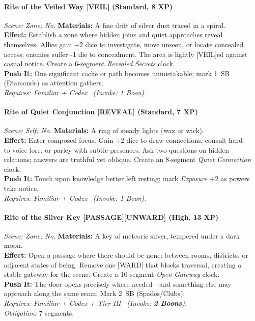 \paragraph{Rite of the Veiled Way \textnormal{[VEIL]} (Standard, 8 XP)} \emph{Scene; Zone; No.}
\textbf{Materials:} A fine drift of silver dust traced in a spiral.\\
\textbf{Effect:} Establish a zone where hidden joins and quiet approaches reveal themselves. Allies gain +2 dice to investigate, move unseen, or locate concealed access; enemies suffer -1 die to concealment. The area is lightly [VEIL]ed against casual notice. Create a 6-segment \emph{Revealed Secrets} clock.\\
\textbf{Push It:} One significant cache or path becomes unmistakable; mark 1~SB (Diamonds) as attention gathers.\\
\emph{Requires: Familiar + Codex \ (\textit{Invoke:} 1 Boon).}

\paragraph{Rite of Quiet Conjunction \textnormal{[REVEAL]} (Standard, 7 XP)} \emph{Scene; Self; No.}
\textbf{Materials:} A ring of steady lights (wax or wick).\\
\textbf{Effect:} Enter composed focus. Gain +2 dice to draw connections, consult hard-to-voice lore, or parley with subtle presences. Ask two questions on hidden relations; answers are truthful yet oblique. Create an 8-segment \emph{Quiet Connection} clock.\\
\textbf{Push It:} Touch upon knowledge better left resting; mark \emph{Exposure} +2 as powers take notice.\\
\emph{Requires: Familiar + Codex \ (\textit{Invoke:} 1 Boon).}

\paragraph{Rite of the Silver Key \textnormal{[PASSAGE][UNWARD]} (High, 13 XP)} \emph{Scene; Zone; No.}
\textbf{Materials:} A key of meteoric silver, tempered under a dark moon.\\
\textbf{Effect:} Open a passage where there should be none: between rooms, districts, or adjacent states of being. Remove one [WARD] that blocks traversal, creating a stable gateway for the scene. Create a 10-segment \emph{Open Gateway} clock.\\
\textbf{Push It:} The door opens precisely where needed—and something else may approach along the same seam. Mark 2~SB (Spades/Clubs).\\
\emph{Requires: Familiar + Codex + Tier III \ (\textit{Invoke:} \textbf{2 Boons}).}\\
\emph{Obligation:} 7 segments.

